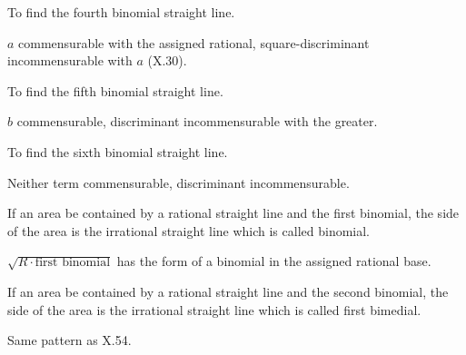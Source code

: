 \begin{claim}
\label{prop:X.51}
To find the fourth binomial straight line.
\end{claim}
\begin{evidence}[Proof of X.51]
\label{ev:X.51}
$a$ commensurable with the assigned rational, square-discriminant
incommensurable with $a$ (X.30).
\end{evidence}

\begin{claim}
\label{prop:X.52}
To find the fifth binomial straight line.
\end{claim}
\begin{evidence}[Proof of X.52]
\label{ev:X.52}
$b$ commensurable, discriminant incommensurable with the greater.
\end{evidence}

\begin{claim}
\label{prop:X.53}
To find the sixth binomial straight line.
\end{claim}
\begin{evidence}[Proof of X.53]
\label{ev:X.53}
Neither term commensurable, discriminant incommensurable.
\end{evidence}

\begin{claim}
\label{prop:X.54}
If an area be contained by a rational straight line and the first
binomial, the side of the area is the irrational straight line which
is called binomial.
\end{claim}
\begin{evidence}[Proof of X.54]
\label{ev:X.54}
$\sqrt{R \cdot \text{first binomial}}$ has the form of a binomial in
the assigned rational base.
\end{evidence}

\begin{claim}
\label{prop:X.55}
If an area be contained by a rational straight line and the second
binomial, the side of the area is the irrational straight line which
is called first bimedial.
\end{claim}
\begin{evidence}[Proof of X.55]
\label{ev:X.55}
Same pattern as X.54.
\end{evidence}

